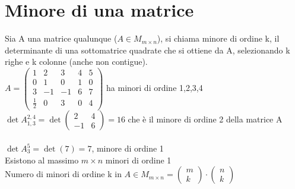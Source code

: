 \section{Minore di una matrice}
Sia A una matrice qualunque ($A\in M_{m\times n}$), si chiama minore di ordine k, il determinante di una sottomatrice quadrate che si ottiene da A, selezionando k righe e k colonne (anche non contigue).\\
$A=\begin{pmatrix}
	1 & 2 & 3 & 4 & 5\\
	0 & 1 & 0 & 1 & 0\\
	3 & -1 & -1 & 6 & 7\\
	\frac{1}{2} & 0 & 3 & 0 & 4
\end{pmatrix}$ ha minori di ordine 1,2,3,4\\
$\det A^{2,4}_{1,3}=\det\begin{pmatrix}
	2 & 4\\
	-1 & 6
\end{pmatrix}=16$ che è il minore di ordine 2 della matrice A\\\\
$\det A^{5}_{3}=\det(7)=7$, minore di ordine 1\\
Esistono al massimo $m\times n$ minori di ordine 1\\
Numero di minori di ordine k in $A\in M_{m\times n}=\begin{pmatrix}
	m\\
	k
\end{pmatrix}\cdot\begin{pmatrix}
	n\\
	k
\end{pmatrix}$\\\\